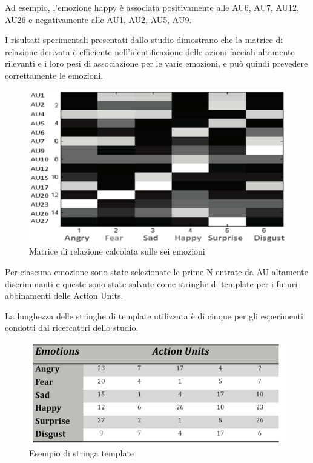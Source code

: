 Ad esempio, l'emozione happy è associata positivamente alle AU6, AU7, AU12, AU26 e negativamente alle AU1, AU2, AU5, AU9. 

I risultati sperimentali presentati dallo studio dimostrano che la matrice di relazione derivata è efficiente nell'identificazione delle azioni facciali altamente rilevanti e i loro pesi di associazione per le varie emozioni, e può quindi prevedere correttamente le emozioni.
\begin{figure}
    \begin{center}    
        \includegraphics[width=0.6\linewidth]{images/19.png}
        \caption{Matrice di relazione calcolata sulle sei emozioni}
        \label{fig:image5}
    \end{center}
\end{figure}

Per ciascuna emozione sono state selezionate le prime N entrate da AU altamente discriminanti e queste sono state salvate come stringhe di template per i futuri abbinamenti delle Action Units. 

La lunghezza delle stringhe di template utilizzata è di cinque per gli esperimenti condotti dai ricercatori dello studio.\newpage
\begin{figure}
    \begin{center}    
        \includegraphics[width=1\linewidth]{images/20.png}
        \caption{Esempio di stringa template}
    \end{center}
\end{figure}

